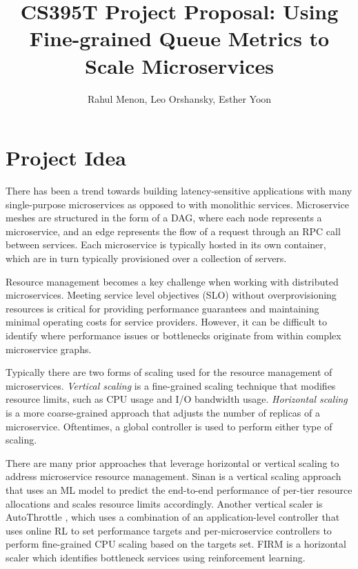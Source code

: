 \documentclass{proposal}
\begin{document}

\title{CS395T Project Proposal: Using Fine-grained Queue Metrics to Scale Microservices
}

\author{Rahul Menon, Leo Orshansky, Esther Yoon}

\maketitle


\section{Project Idea}
There has been a trend towards building latency-sensitive applications with many single-purpose microservices as opposed to with monolithic services. Microservice meshes are structured in the form of a DAG, where each node represents a microservice, and an edge represents the flow of a request through an RPC call between services. Each microservice is typically hosted in its own container, which are in turn typically provisioned over a collection of servers.

Resource management becomes a key challenge when working with distributed microservices. Meeting service level objectives (SLO) without overprovisioning resources is critical for providing performance guarantees and maintaining minimal operating costs for service providers. However, it can be difficult to identify where performance issues or bottlenecks originate from within complex microservice graphs.

Typically there are two forms of scaling used for the resource management of microservices. \textit{Vertical scaling} is a fine-grained scaling technique that modifies resource limits, such as CPU usage and I/O bandwidth usage. \textit{Horizontal scaling} is a more coarse-grained approach that adjusts the number of replicas of a microservice. Oftentimes, a global controller is used to perform either type of scaling.

There are many prior approaches that leverage horizontal or vertical scaling to address microservice resource management. Sinan \cite{sinan} is a vertical scaling approach that uses an ML model to predict the end-to-end performance of per-tier resource allocations and scales resource limits accordingly. Another vertical scaler is AutoThrottle \cite{autothrottle}, which uses a combination of an application-level controller that uses online RL to set performance targets and per-microservice controllers to perform fine-grained CPU scaling based on the targets set. FIRM \cite{firm} is a horizontal scaler which identifies bottleneck services using reinforcement learning. 
\end{document}
